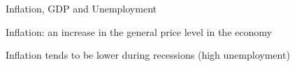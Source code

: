 \documentclass[11pt,aspectratio=43,usenames,dvipsnames]{beamer}
\theoremstyle{definition}
\begin{document}
\begin{frame}{Inflation, GDP and Unemployment}
\label{slide:Inflation__GDP_and_Unemployment}
    \begin{center}
        Inflation: an increase in the \alert{general price level} in the economy

        Inflation tends to be lower during recessions (high unemployment)
    \end{center}
    \begin{figure}
        \centering
    \end{figure}


\end{frame}
\end{document}
